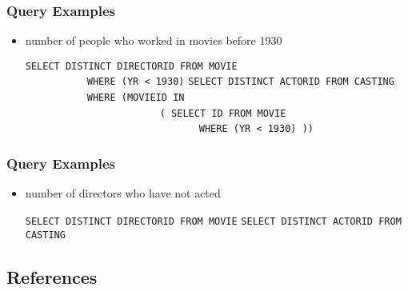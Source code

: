 \documentclass[dvipsnames]{beamer}
\theoremstyle{plain}
\begin{document}
\begin{frame}[fragile]
  \frametitle{Query Examples}

  \begin{itemize}
    \item number of people who worked in movies before 1930

    \medskip
{}
\lstinline!SELECT DISTINCT DIRECTORID FROM MOVIE!\\
~~~~~~~~~~~\lstinline!WHERE (YR < 1930)!
\lstinline!SELECT DISTINCT ACTORID FROM CASTING!\\
~~~~~~~~~~~\lstinline!WHERE (MOVIEID IN!\\
~~~~~~~~~~~~~~~~~~~~~~~~\lstinline!( SELECT ID FROM MOVIE!\\
~~~~~~~~~~~~~~~~~~~~~~~~~~~~~~~\lstinline!WHERE (YR < 1930) ))!
  \end{itemize}
\end{frame}

\begin{frame}[fragile]
  \frametitle{Query Examples}

  \begin{itemize}
    \item number of directors who have not acted

    \medskip
{}
\lstinline!SELECT DISTINCT DIRECTORID FROM MOVIE!
\lstinline!SELECT DISTINCT ACTORID FROM CASTING!
  \end{itemize}
\end{frame}

\subsection*{References}
\end{document}

